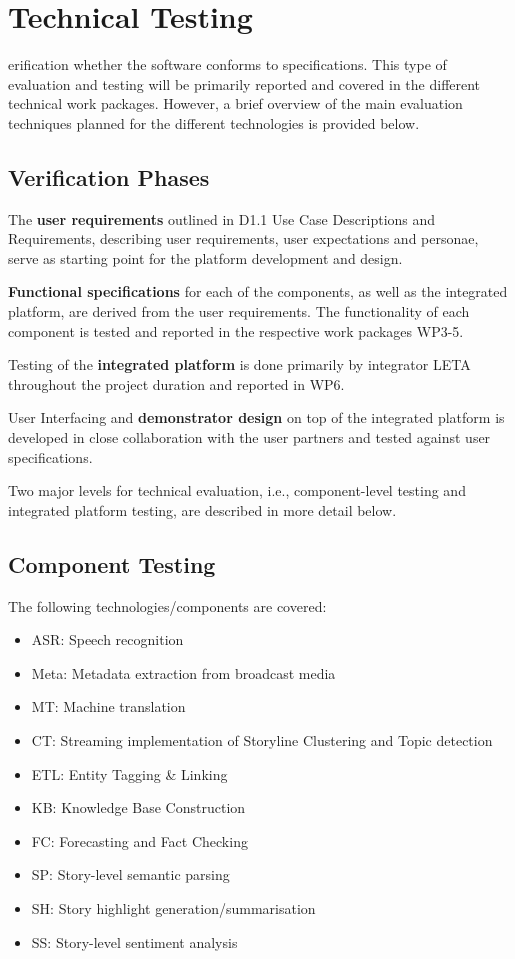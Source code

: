 \section{Technical Testing}\label{sec:technical}


erification  whether the software conforms to specifications. This type of evaluation and testing will be primarily reported and covered in the  different technical work packages. However, a brief overview of the main evaluation techniques planned for the different technologies is provided below.

\subsection{Verification Phases}\label{sec:verification}

The \textbf{user requirements} outlined in D1.1 Use Case Descriptions and Requirements, describing user requirements, user expectations and personae, serve as starting point for the \SUMMA platform development and design.

\textbf{Functional specifications} for each of the components, as well as the integrated platform, are derived from the user requirements. The functionality of each component is tested and reported in the respective work packages WP3-5.

Testing of the \textbf{integrated platform} is done primarily by \SUMMA integrator LETA throughout the project duration and reported in WP6.

User Interfacing and \textbf{demonstrator design} on top of the integrated platform is developed in close collaboration with the user partners and tested against user specifications. 

Two major levels for technical evaluation, i.e., component-level testing and integrated platform testing, are described in more detail below.

\subsection{Component Testing}\label{sec:component}

The following technologies/components are covered:
\begin{itemize}
\item ASR: Speech recognition
\item Meta: Metadata extraction from broadcast media
\item MT: Machine translation
\item CT: Streaming implementation of Storyline Clustering and Topic detection 
\item ETL: Entity Tagging \& Linking 
\item KB: Knowledge Base Construction
\item FC: Forecasting and Fact Checking
\item SP: Story-level semantic parsing 
\item SH: Story highlight generation/summarisation
\item SS: Story-level sentiment analysis
\end{itemize}


